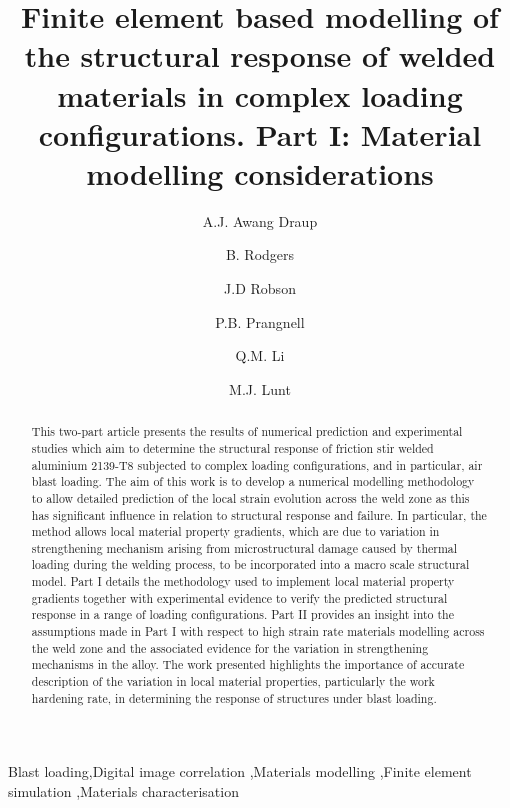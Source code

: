 \begin{frontmatter}
\title{Finite element based modelling of the structural response of welded materials in complex loading configurations. %
Part I: Material modelling considerations}
\author[1]{A.J. Awang Draup }
\author[1]{B. Rodgers}
\author[1]{J.D Robson}
\author[1]{P.B. Prangnell}
\author[1]{Q.M. Li}
\address[1]{The University of Manchester, Manchester, M13 9PL, UK}
\author[2]{M.J. Lunt}
\address[2]{DSTL, Porton, SP4 0JQ, UK}

\begin{abstract}
This two-part article presents the results of numerical  prediction and experimental studies which aim to determine the structural response of friction stir welded aluminium 2139-T8 subjected to complex loading configurations, and in particular, air blast loading. The aim of this work is to develop a numerical modelling methodology to allow detailed prediction of the local strain evolution across the weld zone as this has significant influence in relation to structural response and failure. In particular, the method allows local material property gradients, which are due to variation in strengthening mechanism arising from microstructural damage caused by thermal loading during the welding process, to be incorporated into a macro scale structural model. Part I details the methodology used to implement local material property gradients together with experimental evidence to verify the predicted structural response in a range of loading configurations. Part II provides an insight into the assumptions made in Part I with respect to high strain rate materials modelling across the weld zone and the associated evidence for the variation in strengthening mechanisms in the alloy. The work presented highlights the importance of accurate description of the variation in local material properties, particularly the work hardening rate, in determining the response of structures under blast loading.
\end{abstract}

\begin{keyword}
Blast loading\sep Digital image correlation \sep Materials modelling \sep Finite element simulation \sep Materials characterisation
\end{keyword}

\end{frontmatter}


